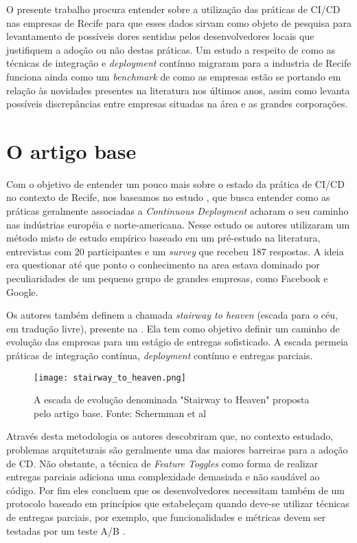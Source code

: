 O presente trabalho procura entender sobre a utilização das práticas de CI/CD nas empresas de Recife para que esses dados sirvam como objeto de pesquisa para levantamento de possíveis dores sentidas pelos desenvolvedores locais que justifiquem a adoção ou não destas práticas. Um estudo a respeito de como as técnicas de integração e \emph{deployment} contínuo migraram para a industria de Recife funciona ainda como um \emph{benchmark} de como as empresas estão se portando em relação às novidades presentes na literatura nos últimos anos, assim como levanta possíveis discrepâncias entre empresas situadas na área e as grandes corporações. 


\section{O artigo base}
Com o objetivo de entender um pouco mais sobre o estado da prática de CI/CD no contexto de Recife, nos baseamos no estudo \cite{empiricalStudy2016}, que busca entender como as práticas geralmente associadas a \emph{Continuous Deployment} acharam o seu caminho nas indústrias européia e norte-americana. Nesse estudo os autores utilizaram um método misto de estudo empírico baseado em um pré-estudo na literatura, entrevistas com 20 participantes e um \emph{survey} que recebeu 187 respostas. A ideia era questionar até que ponto o conhecimento na area estava dominado por peculiaridades de um pequeno grupo de grandes empresas, como Facebook e Google.

Os autores também definem a chamada \emph{stairway to heaven} (escada para o céu, em tradução livre), presente na . Ela tem como objetivo definir um caminho de evolução das empresas para um estágio de entregas sofisticado. A escada permeia práticas de integração contínua, \emph{deployment} contínuo e entregas parciais.

\begin{figure}[ht]
\begin{center}
\texttt{[image: stairway\_to\_heaven.png]}
\end{center}
\caption[Stairway to Heaven]{
    A escada de evolução denominada "Stairway to Heaven" proposta pelo artigo base.
    Fonte: Schermman et al \cite{empiricalStudy2016}
}\label{stairway}

\end{figure}

Através desta metodologia os autores descobriram que, no contexto estudado, problemas arquiteturais são geralmente uma das maiores barreiras para a adoção de CD. Não obstante, a técnica de \emph{Feature Toggles} \cite{featureToggles} como forma de realizar entregas parciais adiciona uma complexidade demasiada e não saudável ao código. Por fim eles concluem que os desenvolvedores necessitam também de um protocolo baseado em princípios que estabeleçam quando deve-se utilizar técnicas de entregas parciais, por exemplo, que funcionalidades e métricas devem ser testadas por um teste A/B \cite{testsAB}.


